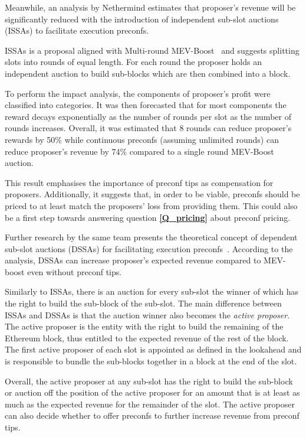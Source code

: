 \documentclass[a4paper]{article}
\theoremstyle{boldstyle}
\begin{document}
    Meanwhile, an analysis by Nethermind \cite{W:EstimatingtheRevenuefromIndependentSub-SlotAuctionPreconfirmations} estimates that proposer's revenue will be significantly reduced with the introduction of independent sub-slot auctions (ISSAs) to facilitate execution preconfs.
        
    ISSAs is a proposal aligned with Multi-round MEV-Boost~\cite{W:BasedPreconfirmationswithMulti-roundMEV-Boost} and suggests splitting slots into rounds of equal length. For each round the proposer holds an independent auction to build sub-blocks which are then combined into a block.

    To perform the impact analysis, the components of proposer's profit were classified into categories. It was then forecasted that for most components the reward decays exponentially as the number of rounds per slot as the number of rounds increases. Overall, it was estimated that 8 rounds can reduce proposer's rewards by 50\% while continuous preconfs (assuming unlimited rounds) can reduce proposer's revenue by 74\% compared to a single round MEV-Boost auction.

    This result emphasises the importance of preconf tips as compensation for proposers. Additionally, it suggests that, in order to be viable, preconfs should be priced to at least match the proposers' loss from providing them. This could also be a first step towards answering question \textbf{\ref{Q_pricing}} about preconf pricing.
    
    Further research by the same team presents the theoretical concept of dependent sub-slot auctions (DSSAs) for facilitating execution preconfs~\cite{W:AnalysingExpectedProposerRevenuefromPreconfirmations}. According to the analysis, DSSAs can increase proposer's expected revenue compared to MEV-boost even without preconf tips.

    Similarly to ISSAs, there is an auction for every sub-slot the winner of which has the right to build the sub-block of the sub-slot. The main difference between ISSAs and DSSAs is that the auction winner also becomes the \textit{active proposer}. The active proposer is the entity with the right to build the remaining of the Ethereum block, thus entitled to the expected revenue of the rest of the block. The first active proposer of each slot is appointed as defined in the lookahead and is responsible to bundle the sub-blocks together in a block at the end of the slot.

    Overall, the active proposer at any sub-slot has the right to build the sub-block or auction off the position of the active proposer for an amount that is at least as much as the expected revenue for the remainder of the slot. The active proposer can also decide whether to offer preconfs to further increase revenue from preconf tips.
\end{document}
